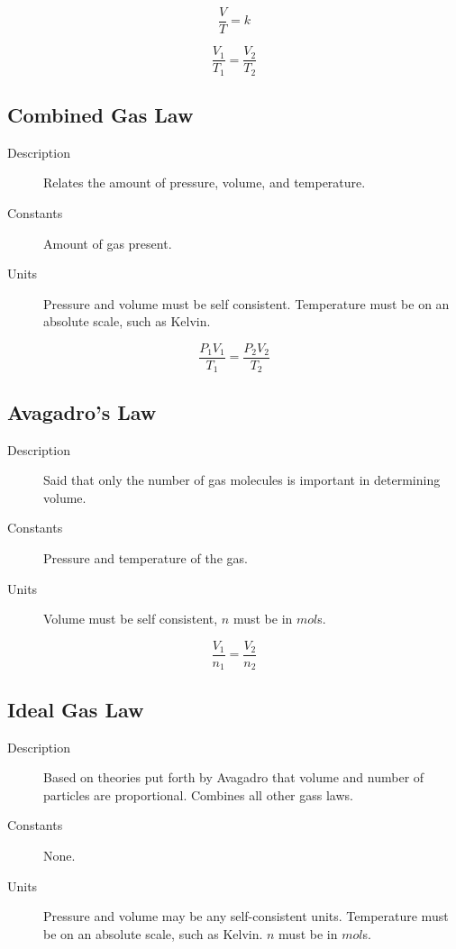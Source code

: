 \begin{equation}
  \frac{V}{T}=k
\end{equation}

\begin{equation}
  \frac{V_1}{T_1}=\frac{V_2}{T_2}
\end{equation}

\subsection{Combined Gas Law}
\begin{description}
  \item[Description] Relates the amount of pressure, volume, and temperature.
  \item[Constants] Amount of gas present.
  \item[Units] Pressure and volume must be self consistent. Temperature must be
    on an absolute scale, such as Kelvin.
\end{description}

\begin{equation}
  \frac{P_1V_1}{T_1}=\frac{P_2V_2}{T_2}
\end{equation}

\subsection{Avagadro's Law}
\begin{description}
  \item[Description] Said that only the number of gas molecules is important in
    determining volume.
  \item[Constants] Pressure and temperature of the gas.
  \item[Units] Volume must be self consistent, $n$ must be in $mol$s.
\end{description}

\begin{equation}
  \frac{V_1}{n_1}=\frac{V_2}{n_2}
\end{equation}


\subsection{Ideal Gas Law}
\begin{description}
  \item[Description] Based on theories put forth by Avagadro that volume and
    number of particles are proportional. Combines all other gass laws.
  \item[Constants] None.
  \item[Units] Pressure and volume may be any self-consistent units. Temperature
    must be on an absolute scale, such as Kelvin. $n$ must be in $mol$s.
\end{description}

